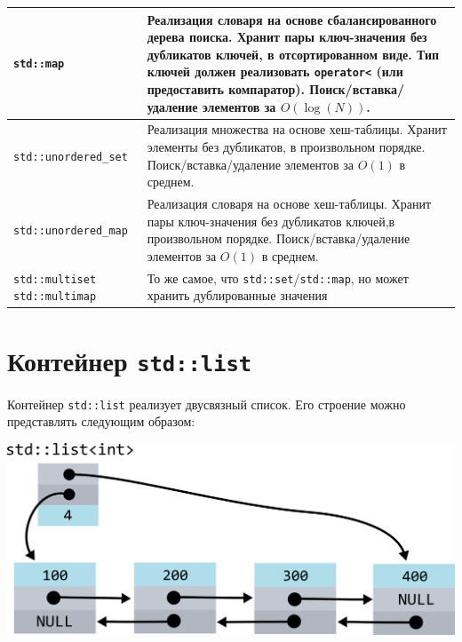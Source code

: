 \documentclass{article}
\begin{document}
\begin{center}
\begin{tabular}{ p{3.3cm} | p{14cm} }
\texttt{std::map} &
Реализация словаря на основе сбалансированного дерева поиска. \newline 
Хранит пары ключ-значения без дубликатов ключей, в отсортированном виде. \newline 
Тип ключей должен реализовать \texttt{operator<}  (или предоставить компаратор).\newline 
Поиск/вставка/удаление элементов за $O(\log(N))$. \newline 
\\ \hline


\texttt{std::unordered\_set} &
Реализация множества на основе хеш-таблицы. \newline 
Хранит элементы без дубликатов, в произвольном порядке. \newline 
Поиск/вставка/удаление элементов за $O(1)$ в среднем. \newline 
\\ \hline


\texttt{std::unordered\_map} &
Реализация словаря на основе хеш-таблицы. \newline 
Хранит пары ключ-значения без дубликатов ключей,в произвольном порядке. \newline 
Поиск/вставка/удаление элементов за $O(1)$ в среднем. \newline 
\\ \hline

\texttt{std::multiset} \newline \texttt{std::multimap}
& То же самое, что \texttt{std::set}/\texttt{std::map}, но может хранить дублированные значения  \\
\hline
\end{tabular}
\egroup
\end{center}



\newpage
\section*{Контейнер \texttt{std::list}}
Контейнер \texttt{std::list} реализует двусвязный список.
Его строение можно представлять следующим образом: 

\begin{center}
\includegraphics[scale=0.8]{../images/list_internals.png}
\end{center}
\end{document}
